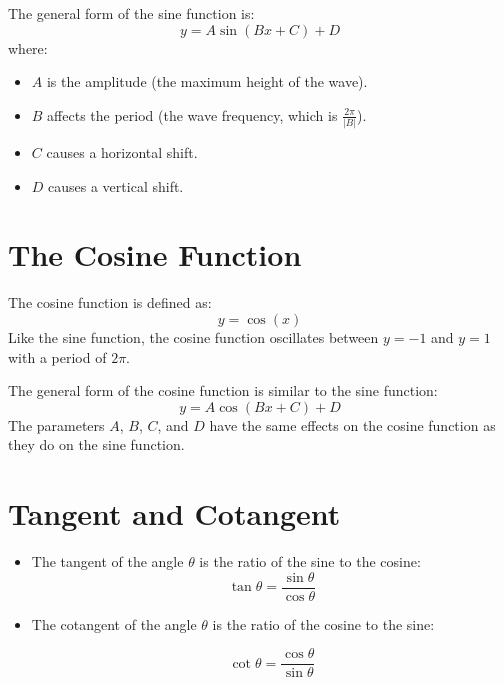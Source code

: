 \documentclass[12pt]{article}
\begin{document}
The general form of the sine function is:
\[
y = A \sin(Bx + C) + D
\]
where:
\begin{itemize}
    \item $A$ is the amplitude (the maximum height of the wave).
    \item $B$ affects the period (the wave frequency, which is $\frac{2\pi}{|B|}$).
    \item $C$ causes a horizontal shift.
    \item $D$ causes a vertical shift.
\end{itemize}

\newpage

\section*{The Cosine Function}
The cosine function is defined as:
\[
y = \cos(x)
\]
Like the sine function, the cosine function oscillates between $y = -1$ and $y = 1$ with a period of $2\pi$.

\begin{center}
\end{center}

The general form of the cosine function is similar to the sine function:
\[
y = A \cos(Bx + C) + D
\]
The parameters $A$, $B$, $C$, and $D$ have the same effects on the cosine function as they do on the sine function.

\newpage

\section*{Tangent and Cotangent}
\begin{itemize}
\item The tangent of the angle \(\theta\) is the ratio of the sine to the cosine:
\[ \tan \theta = \frac{\sin \theta}{\cos \theta}\]

\item The cotangent of the angle \(\theta\) is the ratio of the cosine to the sine:

\[\cot \theta = \frac{\cos \theta}{\sin \theta}\]
\end{itemize}
\end{document}
